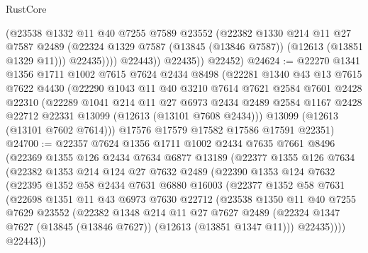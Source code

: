 \begin{lexlean}{RustCore}
\begin{coremodule}
                  (@23538
                    @1332
                    @11
                    @40
                    @7255
                    @7589
                    @23552
                    (@22382
                      @1330
                      @214
                      @11
                      @27
                      @7587
                      @2489
                      (@22324 @1329 @7587 (@13845 (@13846 @7587)) (@12613 (@13851 @1329 @11)))
                      @22435))))
              @22443))
          @22435))
      @22452)
@24624 := @22270
    @1341
    @1356
    @1711
    @1002
    @7615
    @7624
    @2434
    @8498
    (@22281
      @1340
      @43
      @13
      @7615
      @7622
      @4430
      (@22290
        @1043
        @11
        @40
        @3210
        @7614
        @7621
        @2584
        @7601
        @2428
        @22310
        (@22289
          @1041
          @214
          @11
          @27
          @6973
          @2434
          @2489
          @2584
          @1167
          @2428
          @22712
          @22331
          @13099
          (@12613 (@13101 @7608 @2434)))
        @13099
        (@12613 (@13101 @7602 @7614)))
      @17576
      @17579
      @17582
      @17586
      @17591
      @22351)
@24700 := @22357
    @7624
    @1356
    @1711
    @1002
    @2434
    @7635
    @7661
    @8496
    (@22369
      @1355
      @126
      @2434
      @7634
      @6877
      @13189
      (@22377
        @1355
        @126
        @7634
        (@22382
          @1353
          @214
          @124
          @27
          @7632
          @2489
          (@22390
            @1353
            @124
            @7632
            (@22395
              @1352
              @58
              @2434
              @7631
              @6880
              @16003
              (@22377
                @1352
                @58
                @7631
                (@22698
                  @1351
                  @11
                  @43
                  @6973
                  @7630
                  @22712
                  (@23538
                    @1350
                    @11
                    @40
                    @7255
                    @7629
                    @23552
                    (@22382
                      @1348
                      @214
                      @11
                      @27
                      @7627
                      @2489
                      (@22324 @1347 @7627 (@13845 (@13846 @7627)) (@12613 (@13851 @1347 @11)))
                      @22435))))
              @22443))

\end{coremodule}
\end{lexlean}
